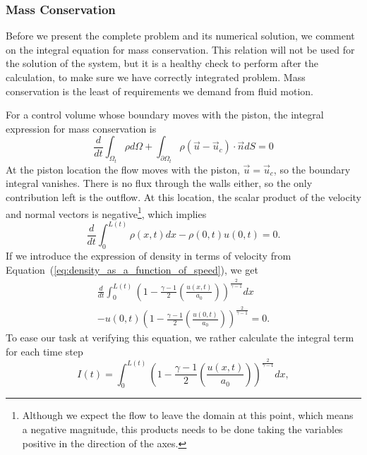 \documentclass[../../thesis.tex]{subfiles}
\begin{document}
\subsubsection{Mass Conservation}
Before we present the complete problem and its numerical solution, we comment 
on the integral equation for mass conservation.
This relation will not be used for the solution of the system, but it is a 
healthy check to perform after the calculation, to make sure we have 
correctly integrated problem.
Mass conservation is the least of requirements we demand from fluid motion.

For a control volume whose boundary moves with the piston, 
the integral expression for mass conservation is
\begin{equation}
    \frac{d}{dt}\int_{\Omega_t} \rho d\Omega 
    + \int_{\partial\Omega_t} \rho \left(\vec{u} - \vec{u}_c\right) \cdot \vec{n} dS = 0
\end{equation}
At the piston location the flow moves with the piston, $\vec{u} = \vec{u}_c$, 
so the boundary integral vanishes. 
There is no flux through the walls either, so the only contribution left is the outflow.
At this location, the scalar product of the velocity and normal vectors is 
negative\footnote{Although we expect the flow to leave the domain at this point, 
which means a negative magnitude, this products needs to be done taking 
the variables positive in the direction of the axes.}, which implies
\begin{equation}
    \frac{d}{dt}\int_{0}^{L(t)} \rho(x,t) dx - \rho(0,t) u(0,t) = 0.
    \label{eq:integral_mass_conservation}
\end{equation}
If we introduce the expression of density in terms of velocity from 
Equation~(\ref{eq:density_as_a_function_of_speed}), we get
\begin{equation}
\begin{split}
        \frac{d}{dt}\int_{0}^{L(t)} \left(1 - \frac{\gamma-1}{2}\left(\frac{u(x,t)}{a_0}\right)\right)^{\frac{2}{\gamma-1}} dx 
        \\
        - u(0,t) \left(1 - \frac{\gamma-1}{2}\left(\frac{u(0,t)}{a_0}\right)\right)^{\frac{2}{\gamma-1}}  = 0.
\end{split}
\end{equation}
To ease our task at verifying this equation, we rather calculate the integral term for each time step
\begin{equation}
    I(t) = \int_{0}^{L(t)} \left(1 - \frac{\gamma-1}{2}\left(\frac{u(x,t)}{a_0}\right)\right)^{\frac{2}{\gamma-1}} dx,
\end{equation}
\end{document}
